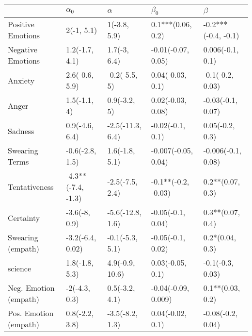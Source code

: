 \begin{tabular}{lllll}
\toprule
{} &          $\alpha_0$ &          $\alpha$ &            $\beta_0$ &              $\beta$ \\
\midrule
Positive Emotions     &          2(-1, 5.1) &      1(-3.8, 5.9) &    0.1***(0.06, 0.2) &  -0.2***(-0.4, -0.1) \\
Negative Emotions     &      1.2(-1.7, 4.1) &      1.7(-3, 6.4) &   -0.01(-0.07, 0.05) &     0.006(-0.1, 0.1) \\
Anxiety               &      2.6(-0.6, 5.9) &     -0.2(-5.5, 5) &     0.04(-0.03, 0.1) &     -0.1(-0.2, 0.03) \\
Anger                 &        1.5(-1.1, 4) &      0.9(-3.2, 5) &    0.02(-0.03, 0.08) &    -0.03(-0.1, 0.07) \\
Sadness               &      0.9(-4.6, 6.4) &  -2.5(-11.3, 6.4) &     -0.02(-0.1, 0.1) &      0.05(-0.2, 0.3) \\
Swearing Terms        &     -0.6(-2.8, 1.5) &    1.6(-1.8, 5.1) &  -0.007(-0.05, 0.04) &   -0.006(-0.1, 0.08) \\
Tentativeness         &  -4.3**(-7.4, -1.3) &   -2.5(-7.5, 2.4) &  -0.1**(-0.2, -0.03) &     0.2**(0.07, 0.3) \\
Certainty             &       -3.6(-8, 0.9) &  -5.6(-12.8, 1.6) &    -0.05(-0.1, 0.04) &     0.3**(0.07, 0.4) \\
Swearing (empath)     &    -3.2(-6.4, 0.02) &   -0.1(-5.3, 5.1) &    -0.05(-0.1, 0.02) &      0.2*(0.04, 0.3) \\
science               &      1.8(-1.8, 5.3) &   4.9(-0.9, 10.6) &     0.03(-0.05, 0.1) &     -0.1(-0.3, 0.03) \\
Neg. Emotion (empath) &       -2(-4.3, 0.3) &    0.5(-3.2, 4.1) &  -0.04(-0.09, 0.009) &     0.1**(0.03, 0.2) \\
Pos. Emotion (empath) &      0.8(-2.2, 3.8) &   -3.5(-8.2, 1.3) &     0.04(-0.02, 0.1) &    -0.08(-0.2, 0.04) \\
\bottomrule
\end{tabular}
